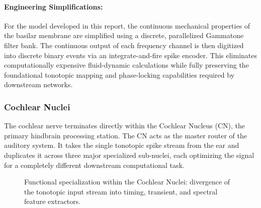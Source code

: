\paragraph{Engineering Simplifications:} For the model developed in this report, the continuous mechanical properties of the basilar membrane are simplified using a discrete, parallelized Gammatone filter bank. The continuous output of each frequency channel is then digitized into discrete binary events via an integrate-and-fire spike encoder. This eliminates computationally expensive fluid-dynamic calculations while fully preserving the foundational tonotopic mapping and phase-locking capabilities required by downstream networks.

\subsubsection{Cochlear Nuclei}
The cochlear nerve terminates directly within the Cochlear Nucleus (CN), the primary hindbrain processing station. The CN acts as the master router of the auditory system. It takes the single tonotopic spike stream from the ear and duplicates it across three major specialized sub-nuclei, each optimizing the signal for a completely different downstream computational task.

\begin{figure}[htbp]
    \centering
    \caption{Functional specialization within the Cochlear Nuclei: divergence of the tonotopic input stream into timing, transient, and spectral feature extractors.}
    \label{fig:cochlear_nucleus}
\end{figure}

